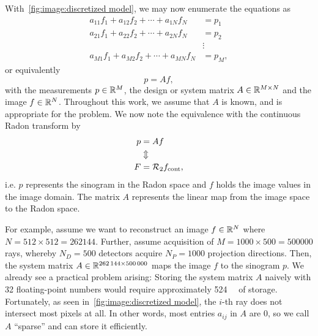 \documentclass[../ml-ct.tex]{subfiles}
\begin{document}
With~\cref{fig:image:discretized model}, we may now enumerate the equations as
\begin{equation}
	\begin{aligned}
		a_{11} f_1 + a_{12} f_2 + \cdots + a_{1N} f_N &= p_1 \\
		a_{21} f_1 + a_{22} f_2 + \cdots + a_{2N} f_N &= p_2 \\
							      & \vdots \\
		a_{M1} f_1 + a_{M2} f_2 + \cdots + a_{MN} f_N &= p_M,
	\end{aligned}
\end{equation}
or equivalently
\begin{equation}
	p = Af,%
	\label{eq:image:linear model}
\end{equation}
with the measurements \( p \in \mathbb{R}^M \), the design or system matrix \( A \in \mathbb{R}^{M\times N} \) and the image \( f \in \mathbb{R}^N \).
Throughout this work, we assume that \( A \) is known, and is appropriate for the problem.
We now note the equivalence with the continuous Radon transform by
\begin{equation}
	\begin{aligned}
		p &= Af \\
		&\Updownarrow \\
		F &= \mathcal{R}_2 f_\text{cont},
	\end{aligned}
	\label{eq:image:matrix radon equivalence}
\end{equation}
i.e. \( p \) represents the sinogram in the Radon space and \( f \) holds the image values in the image domain.
The matrix \( A \) represents the linear map from the image space to the Radon space.

For example, assume we want to reconstruct an image \( f \in \mathbb{R}^N \) where \( N = \num{512} \times \num{512} = \num{262144} \).
Further, assume acquisition of \( M = \num{1000} \times \num{500} = \num{500000} \) rays, whereby \( N_D = \num{500} \) detectors acquire \( N_P = \num{1000} \) projection directions.
Then, the system matrix \( A \in \mathbb{R}^{\num{262144} \times \num{500000}} \) maps the image \( f \) to the sinogram \( p \).
We already see a practical problem arising:
Storing the system matrix \( A \) naively with \SI{32}{\bit} floating-point numbers would require approximately \SI{524}{\giga\byte} of storage.
Fortunately, as seen in~\cref{fig:image:discretized model}, the \( i \)-th ray does not intersect most pixels at all.
In other words, most entries \( a_{ij} \) in \( A \) are \num{0}, so we call \( A \) \enquote{sparse} and can store it efficiently.
\end{document}
